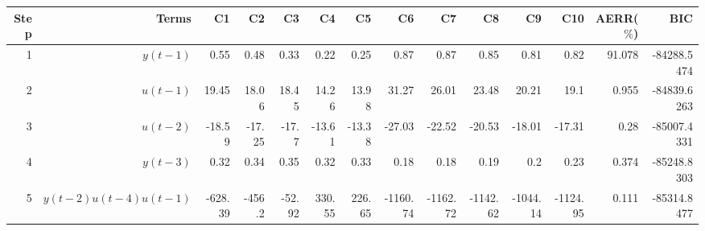 \begin{tabular}{rrrrrrrrrrrrrr}
Step & Terms & C1 & C2 & C3 & C4 & C5 & C6 & C7 & C8 & C9 & C10 & AERR($\%$) & BIC \\ 
\hline 
1 & $y(t-1)$ & 0.55 & 0.48 & 0.33 & 0.22 & 0.25 & 0.87 & 0.87 & 0.85 & 0.81 & 0.82 & 91.078 & -84288.5474 \\ 
2 & $u(t-1)$ & 19.45 & 18.06 & 18.45 & 14.26 & 13.98 & 31.27 & 26.01 & 23.48 & 20.21 & 19.1 & 0.955 & -84839.6263 \\ 
3 & $u(t-2)$ & -18.59 & -17.25 & -17.7 & -13.61 & -13.38 & -27.03 & -22.52 & -20.53 & -18.01 & -17.31 & 0.28 & -85007.4331 \\ 
4 & $y(t-3)$ & 0.32 & 0.34 & 0.35 & 0.32 & 0.33 & 0.18 & 0.18 & 0.19 & 0.2 & 0.23 & 0.374 & -85248.8303 \\ 
5 & $y(t-2)u(t-4)u(t-1)$ & -628.39 & -456.2 & -52.92 & 330.55 & 226.65 & -1160.74 & -1162.72 & -1142.62 & -1044.14 & -1124.95 & 0.111 & -85314.8477 \\ 
\hline 
\end{tabular}
